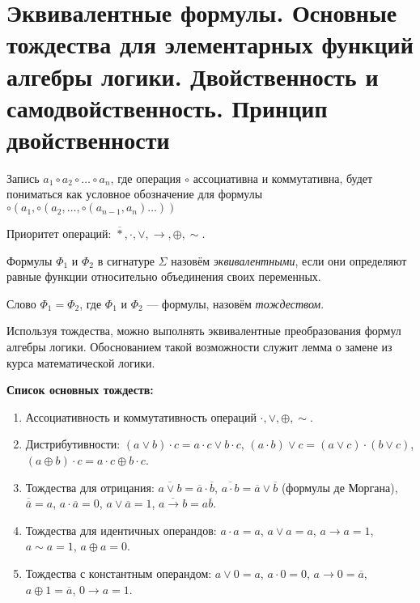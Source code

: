 \section{Эквивалентные формулы. Основные тождества для элементарных функций алгебры логики. Двойственность и самодвойственность. Принцип двойственности}

Запись $a_1 \circ a_2 \circ \ldots \circ a_n$, где операция $\circ$ ассоциативна и коммутативна, будет пониматься как условное обозначение для формулы $\circ(a_1, \circ(a_2, \ldots, \circ(a_{n - 1}, a_n)\ldots))$

Приоритет операций: $\overline{\ast}, \cdot, \vee, \to, \oplus, \sim$.

\begin{definition}
    Формулы $\Phi_1$ и $\Phi_2$ в сигнатуре $\Sigma$ назовём \textit{эквивалентными}, если они определяют равные функции относительно объединения своих переменных.
\end{definition}

\begin{definition}
    Слово $\Phi_1 = \Phi_2$, где $\Phi_1$ и $\Phi_2$ --- формулы, назовём \textit{тождеством}.
\end{definition}

\begin{remark}
    Используя тождества, можно выполнять эквивалентные преобразования формул алгебры логики. Обоснованием такой возможности служит лемма о замене из курса математической логики.
\end{remark}

\textbf{Список основных тождеств:}
\begin{enumerate}[nolistsep]
    \item Ассоциативность и коммутативность операций $\cdot, \vee, \oplus, \sim$.
    \item Дистрибутивности: $(a \vee b) \cdot c = a \cdot c \vee b \cdot c$, $(a \cdot b) \vee c = (a \vee c) \cdot (b \vee c)$, $(a \oplus b) \cdot c = a \cdot c \oplus b \cdot c$.
    \item Тождества для отрицания: $\overline{a \vee b} = \overline{a} \cdot \overline{b}$, $\overline{a \cdot b} = \overline{a} \vee \overline{b}$ (формулы де Моргана), $\overline{\overline{a}} = a$, $a \cdot \overline{a} = 0$, $a \vee \overline{a} = 1$, $\overline{a \to b} = a\overline{b}$.
    \item Тождества для идентичных операндов: $a \cdot a = a$, $a \vee a = a$, $a \to a = 1$, $a \sim a = 1$, $a \oplus a = 0$.
    \item Тождества с константным операндом: $a \vee 0 = a$, $a \cdot 0 = 0$, $a \to 0 = \overline{a}$, $a \oplus 1 = \overline{a}$, $0 \to a = 1$.
\end{enumerate}

